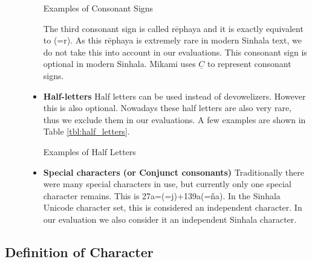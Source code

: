 \documentclass[english]{jnlp_1.3e}
\begin{document}
\begin{description}
\begin{itemize}
\begin{table}[t]
\caption{Examples of Consonant Signs}
\label{tbl:consonant_signs}

\end{table}

The third  consonant sign  is called  r\={e}phaya  and it is exactly equivalent to {\SHb{}}(=r).
As this  r\={e}phaya  is extremely rare in modern Sinhala text, we do not take this into account in our evaluations. This  consonant sign  is optional in modern Sinhala.
Mikami uses $\underline{C} $ to represent  consonant signs.

\item \textbf{Half-letters}
 Half letters  can be used instead of    devowelizers. 
However this is also optional.
Nowadays these  half letters  are also very rare, thus we  exclude  them in our evaluations. 
A few examples are shown in Table \ref{tbl:half_letters}.

\begin{table}[t]
\caption{Examples of Half Letters}
\label{tbl:half_letters}

\end{table}

\item \textbf{Special characters (or Conjunct consonants)}
Traditionally there were many  special characters  in use, but currently only one  special character  remains. 
This is {\SHc\char27a}={\SHa{}}(=j)+{\SHb\char139a}(=\~{n}a).
In the Sinhala Unicode character set, this is considered  an   independent  character. 
In our evaluation we also consider  it an 
independent Sinhala  character. 

\end{itemize}
\end{description}



\subsection{Definition of Character}
\end{document}
